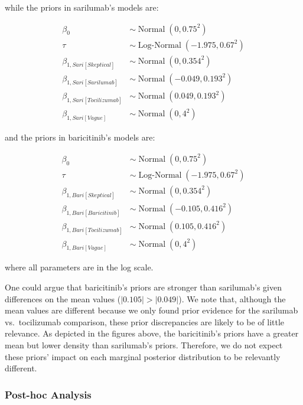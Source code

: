 \documentclass[
  12pt,
]{article}
\begin{document}
while the priors in sarilumab's models are:

\begin{align*}
\beta_0 & \sim \operatorname{Normal}(0, 0.75^2)\\
\tau & \sim \operatorname{Log-Normal}(-1.975, 0.67^2)\\
\beta_{1, Sari[Skeptical]} & \sim \operatorname{Normal}(0, 0.354^2)\\
\beta_{1, Sari[Sarilumab]} & \sim \operatorname{Normal}(-0.049, 0.193^2)\\
\beta_{1, Sari[Tocilizumab]} & \sim \operatorname{Normal}(0.049, 0.193^2)\\
\beta_{1, Sari[Vague]} & \sim \operatorname{Normal}(0, 4^2)
\end{align*}

and the priors in baricitinib's models are:

\begin{align*}
\beta_0 & \sim \operatorname{Normal}(0, 0.75^2)\\
\tau & \sim \operatorname{Log-Normal}(-1.975, 0.67^2)\\
\beta_{1, Bari[Skeptical]} & \sim \operatorname{Normal}(0, 0.354^2)\\
\beta_{1, Bari[Baricitinib]} & \sim \operatorname{Normal}(-0.105, 0.416^2)\\
\beta_{1, Bari[Tocilizumab]} & \sim \operatorname{Normal}(0.105, 0.416^2)\\
\beta_{1, Bari[Vague]} & \sim \operatorname{Normal}(0, 4^2)
\end{align*}

where all parameters are in the log scale.

One could argue that baricitinib's priors are stronger than sarilumab's
given differences on the mean values (\(|0.105| > |0.049|\)). We note
that, although the mean values are different because we only found prior
evidence for the sarilumab vs.~tocilizumab comparison, these prior
discrepancies are likely to be of little relevance. As depicted in the
figures above, the baricitinib's priors have a greater mean but lower
density than sarilumab's priors. Therefore, we do not expect these
priors' impact on each marginal posterior distribution to be relevantly
different.

\newpage

\hypertarget{post-hoc-analysis}{%
\subsubsection{Post-hoc Analysis}\label{post-hoc-analysis}}
\end{document}
